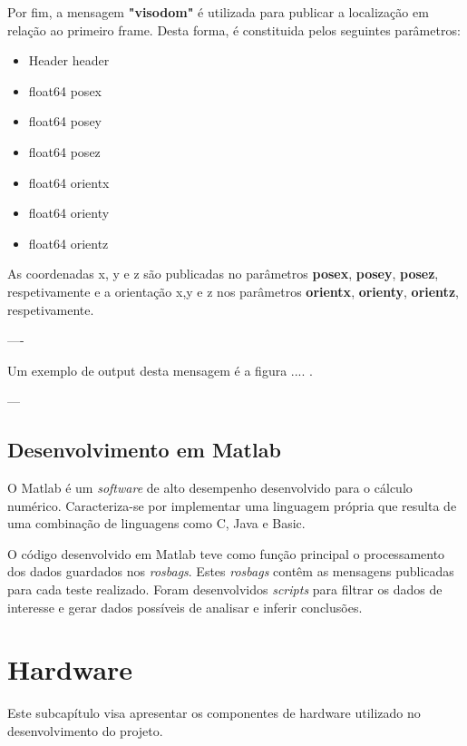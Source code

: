 	
	Por fim, a mensagem \textbf{"visodom"} é utilizada para publicar a localização em relação ao primeiro frame. Desta forma, é constituida pelos seguintes parâmetros:
	
	\begin{itemize}
		 
		\item Header header
	
		\item float64 posex
		\item float64 posey
		\item float64 posez
	
		\item float64 orientx
		\item float64 orienty
		\item float64 orientz
	
	\end{itemize}

	As coordenadas x, y e z são publicadas no parâmetros \textbf{posex}, \textbf{posey}, \textbf{posez}, respetivamente e a orientação x,y e z nos parâmetros \textbf{orientx}, \textbf{orienty}, \textbf{orientz}, respetivamente. 
	
	
	----
	
	Um exemplo de output desta mensagem é a figura .... .
	
	---
	
	

\subsection{Desenvolvimento em Matlab}

O Matlab é um \textit{software} de alto desempenho desenvolvido para o cálculo numérico. Caracteriza-se por implementar uma linguagem própria que resulta de uma combinação de linguagens como C, Java e Basic.

O código desenvolvido em Matlab teve como função principal o processamento dos dados guardados nos \textit{rosbags}. Estes \textit{rosbags} contêm as mensagens publicadas para cada teste realizado. Foram desenvolvidos \textit{scripts} para filtrar os dados de interesse e gerar dados possíveis de analisar e inferir conclusões.


\section{Hardware}

Este subcapítulo visa apresentar os componentes de hardware utilizado no desenvolvimento do projeto.

